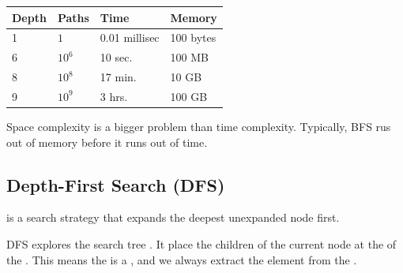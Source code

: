 \begin{table}[ht!]
    \renewcommand{\arraystretch}{1.25}
    \centering
    \begin{tabular}{| l | l | l | l |}
        \hline
        Depth & Paths    & Time          & Memory    \\ \hline
        1     & $1$      & 0.01 millisec & 100 bytes \\ \hline
        6     & $10^6$   & 10 sec.       & 100 MB    \\ \hline
        8     & $10^8$   & 17 min.       & 10 GB     \\ \hline
        9     & $10^{9}$ & 3 hrs.        & 100 GB    \\ \hline
    \end{tabular}
\end{table}

Space complexity is a bigger problem than time complexity. Typically, BFS rus out of memory before it runs out of time.

\subsection{Depth-First Search (DFS)}

\begin{definition}\label{def:dfs}
     is a search strategy that expands the deepest unexpanded node first.
\end{definition}

DFS explores the search tree . It place the children of the current node at the  of the \Frontier. This means the \Frontier is a , and we always extract the  element from the \Frontier.

